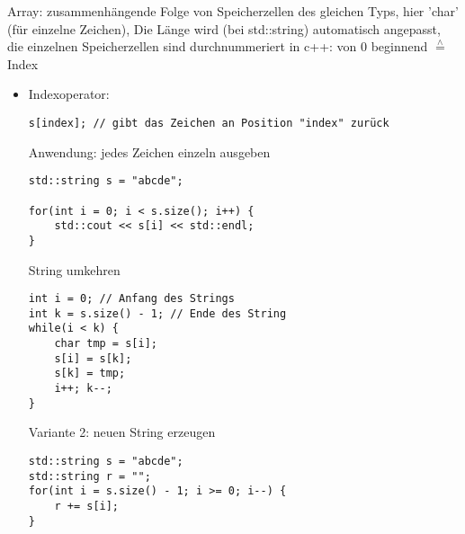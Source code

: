 \documentclass[a4paper]{scrartcl}
\newcommand{\estimates}{\overset{\scriptscriptstyle\wedge}{=}}%
\theoremstyle{definition}
\theoremstyle{plain}
\theoremstyle{remark}
\theoremstyle{remark}
\begin{document}
\begin{itemize}
\begin{itemize}
       Array: zusammenhängende Folge von Speicherzellen des gleichen Typs, hier 'char' (für einzelne Zeichen), Die Länge wird (bei std::string) automatisch angepasst, die einzelnen Speicherzellen sind durchnummeriert
in c++: von $0$ beginnend $\estimates$ Index
\begin{itemize}
\item Indexoperator:
\begin{verbatim}
s[index]; // gibt das Zeichen an Position "index" zurück
\end{verbatim}
Anwendung: jedes Zeichen einzeln ausgeben
\begin{verbatim}
std::string s = "abcde";

for(int i = 0; i < s.size(); i++) {
	std::cout << s[i] << std::endl;
}
\end{verbatim}
String umkehren
\begin{verbatim}
int i = 0; // Anfang des Strings
int k = s.size() - 1; // Ende des String
while(i < k) {
	char tmp = s[i];
	s[i] = s[k];
	s[k] = tmp;
	i++; k--;
}
\end{verbatim}
Variante 2: neuen String erzeugen
\begin{verbatim}
std::string s = "abcde";
std::string r = "";
for(int i = s.size() - 1; i >= 0; i--) {
	r += s[i];
}
\end{verbatim}
\end{itemize}
\end{itemize}
\end{itemize}
\end{document}
